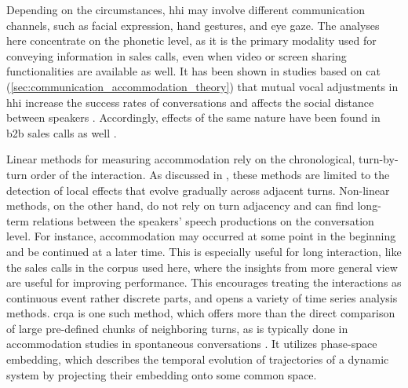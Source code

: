 Depending on the circumstances, \ac{hhi} may involve different communication channels, such as facial expression, hand gestures, and eye gaze.
The analyses here concentrate on the phonetic level, as it is the primary modality used for conveying information in sales calls, even when video or screen sharing functionalities are available as well.
It has been shown in studies based on \ac{cat} (\cref{sec:communication_accommodation_theory}) that
mutual vocal adjustments in \ac{hhi} increase the success rates of conversations \citep{Pickering2004behavioral} and affects the social distance between speakers \citep{Schweitzer2017social}.
Accordingly, effects of the same nature have been found in \ac{b2b} sales calls as well \citep{Orlob2018roi}.

Linear methods for measuring accommodation rely on the chronological, turn-by-turn order of the interaction.
As discussed in , these methods are limited to the detection of local effects that evolve gradually across adjacent turns.
Non-linear methods, on the other hand, do not rely on turn adjacency and can find long-term relations between the speakers' speech productions on the conversation level.
For instance, accommodation may occurred at some point in the beginning and be continued at a later time.
This is especially useful for long interaction, like the sales calls in the corpus used here, where the insights from more general view are useful for improving performance.
This encourages treating the interactions as continuous event rather discrete parts, and opens a variety of time series analysis methods.
\Ac{crqa} is one such method, which offers more than the direct comparison of large pre-defined chunks of neighboring turns, as is typically done in accommodation studies in spontaneous conversations \citep[e.g.,][]{Levitan2013entrainment, Rahimi2018weighting}.
It utilizes phase-space embedding, which describes the temporal evolution of trajectories of a dynamic system by projecting their embedding onto some common space.


